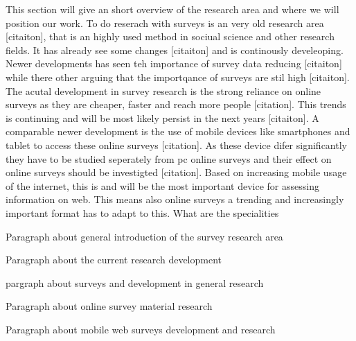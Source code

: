 This section will give an short overview of the research area and where we will position our work. To do reserach with surveys is an very old research area [citaiton], that is an highly used method in sociual science and other research fields. It has already see some changes [citaiton] and is continously develeoping. Newer developments has seen teh importance of survey data reducing [citaiton] while there other arguing that the importqance of surveys are stil high [citaiton]. The acutal development in survey research  is the strong reliance on online surveys as they are cheaper, faster and reach more people [citation]. This trends is continuing and will be most likely persist in the next years [citaiton]. A comparable newer development is the use of mobile devices like smartphones and tablet to access these online surveys [citation]. As these device difer significantly they have to be studied seperately from pc online surveys and their effect on online surveys should be investigted [citation].
Based on increasing mobile usage of the internet, this is and will be the most important device for assessing information on web. This means also online surveys a trending and increasingly important format has to adapt to this. What are the specialities




Paragraph about general introduction of the survey research area

Paragraph about the current research development

pargraph about surveys and development in general research

Paragraph about online survey material research

Paragraph about mobile web surveys development and research
